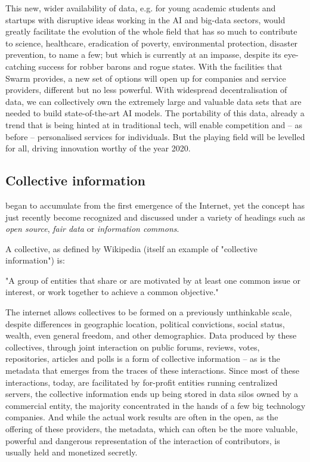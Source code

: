 This new, wider availability of data, e.g. for young academic students and startups with disruptive ideas working in the AI and big-data sectors, would greatly facilitate the evolution of the whole field that has so much to contribute to science, healthcare, eradication of poverty, environmental protection, disaster prevention, to name a few; but which is currently at an impasse, despite its eye-catching success for robber barons and rogue states. With the facilities that Swarm provides, a new set of options will open up for companies and service providers, different but no less powerful. With widespread decentralisation of data, we can collectively own the extremely large and valuable data sets that are needed to build state-of-the-art AI models. The portability of this data, already a trend that is being hinted at in traditional tech, will enable competition and – as before – personalised services for individuals. But the playing field will be levelled for all, driving innovation worthy of the year 2020. 



\subsection{Collective information \statusgreen}\label{sec:collective_information}

 began to accumulate from the first emergence of the Internet, yet the concept has just recently become recognized and discussed under a variety of headings such as  \emph{open source}, \emph{fair data} or \emph{information commons}.

A collective, as defined by Wikipedia (itself an example of "collective information") is:
\begin{displayquote}
"A group of entities that share or are motivated by at least one common issue or interest, or work together to achieve a common objective." 
\end{displayquote}
The internet allows collectives to be formed on a previously unthinkable scale, despite differences in geographic location, political convictions, social status, wealth, even general freedom, and other demographics. Data produced by these collectives, through joint interaction on public forums, reviews, votes, repositories, articles and polls is a form of collective information – as is the metadata that emerges from the traces of these interactions. Since most of these interactions, today, are facilitated by for-profit entities running centralized servers, the collective information ends up being stored in data silos owned by a commercial entity, the majority concentrated in the hands of a few big technology companies. And while the actual work results are often in the open, as the offering of these providers, the metadata, which can often be the more valuable, powerful and dangerous representation of the interaction of contributors, is usually held and monetized secretly.

